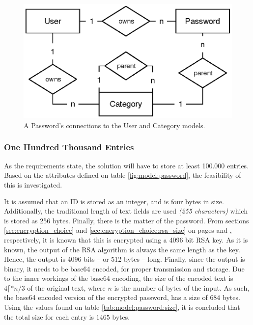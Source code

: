 			\begin{figure}[p]
				\centering
				\includegraphics[scale=0.75]{figures/design/uml/erd/user-password-category.eps}
				\caption{A Password's connections to the User and Category models.}
				\label{fig:relationship:password}
			\end{figure}

			\subsubsection{One Hundred Thousand Entries}
				\label{sec:model:password:size}
				As the requirements state, the solution will have to store at least 100.000 entries. Based on the attributes defined on table \ref{fig:model:password}, the feasibility of this is investigated. 

				It is assumed that an ID is stored as an integer, and is four bytes in size. Additionally, the traditional length of text fields are used \emph{(255 characters)} which is stored as 256 bytes. Finally, there is the matter of the password. From sections \ref{sec:encryption_choice} and \ref{sec:encryption_choice:rsa_size} on pages \pageref{sec:encryption_choice} and \pageref{sec:encryption_choice:rsa_size}, respectively, it is known that this is encrypted using a 4096 bit RSA key. As it is known, the output of the RSA algorithm is always the same length as the key. Hence, the output is 4096 bits -- or 512 bytes -- long. Finally, since the output is binary, it needs to be base64 encoded, for proper transmission and storage. Due to the inner workings of the base64 encoding, the size of the encoded text is $4\lceil*{n/3}$ of the original text, where $n$ is the number of bytes of the input. As such, the base64 encoded version of the encrypted password, has a size of $684$ bytes. Using the values found on table \ref{tab:model:password:size}, it is concluded that the total size for each entry is $1465$ bytes.


